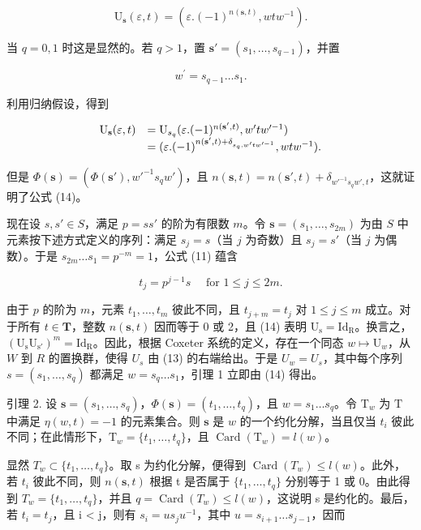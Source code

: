 \[
\mathrm{U} _ {\mathbf {s}} (\varepsilon , t) = (\varepsilon . (- 1) ^ {n (\mathbf {s}, t)}, w t w ^ {- 1}).\tag{14}
\]

当 \(q = 0,1\) 时这是显然的。若 \(q > 1\)，置 \(\mathbf{s}' = (s_1,\dots ,s_{q - 1})\)，并置

\[
w ^ {\prime} = s _ {q - 1} \dots s _ {1}.
\]

利用归纳假设，得到

\[
\begin{array}{r l} \mathrm{U} _ {\mathbf {s}} (\varepsilon , t) & = \mathrm{U} _ {s _ {q}} (\varepsilon . (- 1) ^ {n (\mathbf {s} ^ {\prime}, t)}, w ^ {\prime} t w ^ {\prime - 1}) \\ & = (\varepsilon . (- 1) ^ {n (\mathbf {s} ^ {\prime}, t) + \delta_ {s _ {q}, w ^ {\prime} t w ^ {\prime - 1}}}, w t w ^ {- 1}). \end{array}
\]

但是 \(\Phi(\mathbf{s}) = (\Phi(\mathbf{s}'), w'^{-1}s_q w')\)，且 \(n(\mathbf{s}, t) = n(\mathbf{s}', t) + \delta_{w'^{-1}s_q w', t}\)，这就证明了公式 (14)。

现在设 \(s, s' \in S\)，满足 \(p = ss'\) 的阶为有限数 \(m\)。令 \(\mathbf{s} = (s_1, \ldots, s_{2m})\) 为由 \(S\) 中元素按下述方式定义的序列：满足 \(s_j = s\)（当 \(j\) 为奇数）且 \(s_j = s'\)（当 \(j\) 为偶数）。于是 \(s_{2m} \ldots s_1 = p^{-m} = 1\)，公式 (11) 蕴含

\[
t _ {j} = p ^ {j - 1} s \quad \text { for } 1 \leqslant j \leqslant 2 m.\tag{15}
\]

由于 \(p\) 的阶为 \(m\)，元素 \(t_1, \ldots, t_m\) 彼此不同，且 \(t_{j+m} = t_j\) 对 \(1 \leqslant j \leqslant m\) 成立。对于所有 \(t \in \mathbf{T}\)，整数 \(n(\mathbf{s}, t)\) 因而等于 0 或 2，且 (14) 表明 \(\mathrm{U_s} = \mathrm{Id_R}\)。换言之，\((\mathrm{U_sU_{s'}})^m = \mathrm{Id_R}\)。因此，根据 Coxeter 系统的定义，存在一个同态 \(w \mapsto \mathrm{U}_w\)，从 \(W\) 到 \(R\) 的置换群，使得 \(U_s\) 由 (13) 的右端给出。于是 \(U_w = U_s\)，其中每个序列 \(s = (s_1, \ldots, s_q)\) 都满足 \(w = s_q \ldots s_1\)，引理 1 立即由 (14) 得出。

引理 2. 设 \(\mathbf{s} = (s_1, \ldots, s_q)\)，\(\Phi(\mathbf{s}) = (t_1, \ldots, t_q)\)，且 \(w = s_1 \ldots s_q\)。令 \(\mathrm{T}_w\) 为 \(\mathrm{T}\) 中满足 \(\eta(w, t) = -1\) 的元素集合。则 \(\mathbf{s}\) 是 \(w\) 的一个约化分解，当且仅当 \(t_i\) 彼此不同；在此情形下，\(\mathrm{T}_w = \{t_1, \ldots, t_q\}\)，且 \(\operatorname{Card}(\mathrm{T}_w) = l(w)\)。

显然 \(T_{w} \subset \{t_{1}, \ldots, t_{q}\}\)。取 s 为约化分解，便得到 \(\operatorname{Card}(T_{w}) \leqslant l(w)\)。此外，若 \(t_{i}\) 彼此不同，则 \(n(\mathbf{s}, t)\) 根据 t 是否属于 \(\{t_{1}, \ldots, t_{q}\}\) 分别等于 1 或 0。由此得到 \(T_{w} = \{t_{1}, \ldots, t_{q}\}\)，并且 \(q = \operatorname{Card}(T_{w}) \leqslant l(w)\)，这说明 s 是约化的。最后，若 \(t_{i} = t_{j}\)，且 i \textless{} j，则有 \(s_{i} = us_{j}u^{-1}\)，其中 \(u = s_{i+1} \ldots s_{j-1}\)，因而

